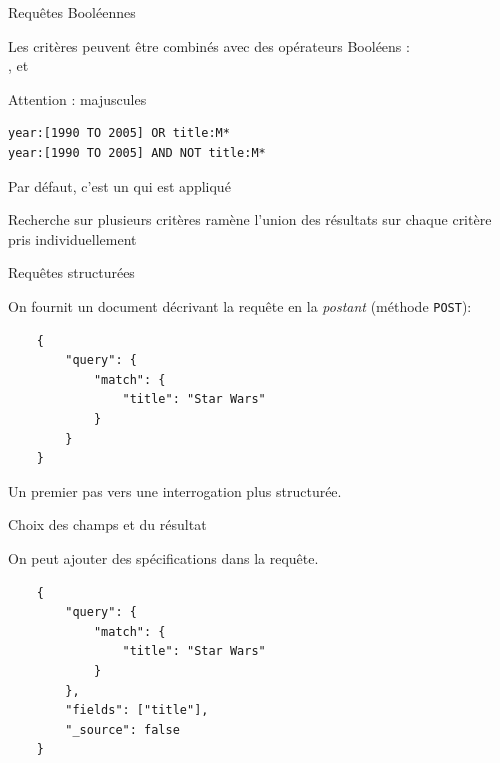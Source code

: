 \begin{frame}[fragile]{Requêtes Booléennes}

  \begin{redbullet}
    \item Les critères peuvent être combinés avec des \alert{opérateurs
      Booléens} :\\
      ,  et 
    \item Attention : majuscules
  \end{redbullet}
\begin{verbatim}
year:[1990 TO 2005] OR title:M*
year:[1990 TO 2005] AND NOT title:M*
\end{verbatim}
   
\begin{redbullet}
  \item Par défaut, c'est un  qui est appliqué
  \item Recherche sur plusieurs critères ramène l'union des résultats sur chaque
    critère pris individuellement
\end{redbullet}
\end{frame}

\begin{frame}[fragile]{Requêtes structurées}

On fournit un document décrivant la requête en la \textit{postant}  
(méthode \texttt{POST}):

\vfill

\begin{verbatim}
	{
    	"query": {
      		"match": {
        		"title": "Star Wars"
      		}
  		}
   	}
\end{verbatim}

\vfill

Un premier pas vers une interrogation plus structurée.

\end{frame}

\begin{frame}[fragile]{Choix des champs et du résultat}

On peut ajouter des spécifications dans la requête.

\vfill

\begin{verbatim}
	{
    	"query": {
      		"match": {
        		"title": "Star Wars"
      		}
  		},
  		"fields": ["title"],
  		"_source": false
   	}
\end{verbatim}

\end{frame}

